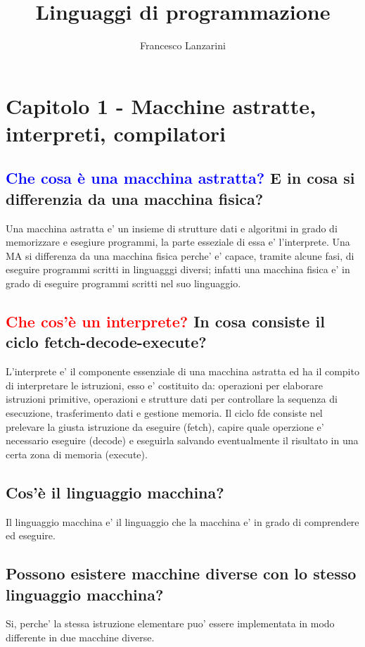 \documentclass{article}
\title{Linguaggi di programmazione}
\author{Francesco Lanzarini}
\date{ }
\begin{document}
\maketitle

\section{Capitolo 1 - Macchine astratte, interpreti, compilatori}
\subsection{\textcolor{blue}{Che cosa è una macchina astratta?} E in cosa si differenzia da una macchina fisica?}
Una macchina astratta e' un insieme di strutture dati e algoritmi in grado di memorizzare e esegiure programmi, la parte esseziale di essa e' l'interprete.
Una MA si differenza da una macchina fisica perche' e' capace, tramite alcune fasi, di eseguire programmi scritti in linguagggi diversi; infatti una macchina
fisica e' in grado di eseguire programmi scritti nel suo linguaggio.
\subsection{\textcolor{red}{Che cos'è un interprete?} In cosa consiste il ciclo fetch-decode-execute?}
L'interprete e' il componente essenziale di una macchina astratta ed ha il compito di interpretare le istruzioni, esso e' costituito da: operazioni per
elaborare istruzioni primitive, operazioni e strutture dati per controllare la sequenza di esecuzione, trasferimento dati e gestione memoria.
Il ciclo fde consiste nel prelevare la giusta istruzione da eseguire (fetch), capire quale operzione e' necessario eseguire (decode) e eseguirla salvando eventualmente
il risultato in una certa zona di memoria (execute).
\subsection{Cos'è il linguaggio macchina?}
Il linguaggio macchina e' il linguaggio che la macchina e' in grado di
comprendere ed eseguire.
\subsection{Possono esistere macchine diverse con lo stesso linguaggio macchina?}
Si, perche' la stessa istruzione elementare puo' essere implementata in modo
differente in due macchine diverse.
\end{document}
